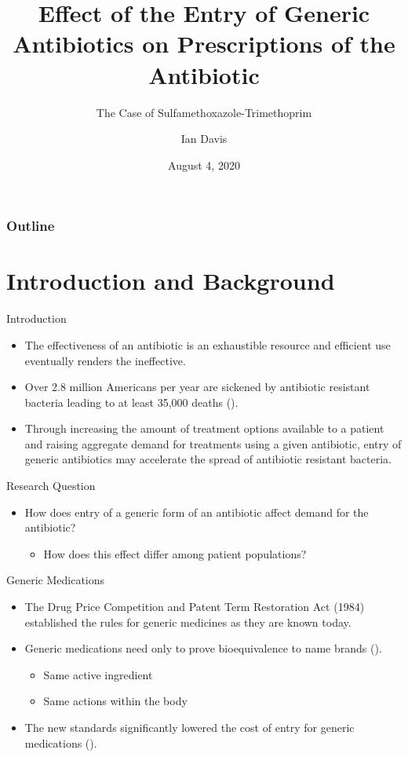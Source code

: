 \documentclass{beamer}
\title{Effect of the Entry of Generic Antibiotics on Prescriptions of the Antibiotic}
\subtitle{The Case of Sulfamethoxazole-Trimethoprim}
\author{Ian Davis}
\institute{Clemson University}
\date{August 4, 2020}
\begin{document}
\begin{frame}
\titlepage
\end{frame}

\begin{frame}
\frametitle{Outline}
\tableofcontents
\end{frame}

\section{Introduction and Background}
\begin{frame}{Introduction}
\begin{itemize}
\item The effectiveness of an antibiotic is an exhaustible resource and efficient use eventually renders the ineffective.
\item Over 2.8 million Americans per year are sickened by antibiotic resistant bacteria leading to at least 35,000 deaths (\cite{centers_for_disease_control_and_prevention_us_antibiotic_2019}).
\item Through increasing the amount of treatment options available to a patient and raising aggregate demand for treatments using a given antibiotic, entry of generic antibiotics may accelerate the spread of antibiotic resistant bacteria.
\end{itemize}
\end{frame}

\begin{frame}{Research Question}
\begin{itemize}
\item How does entry of a generic form of an antibiotic affect demand for the antibiotic? 
\begin{itemize}
\item How does this effect differ among patient populations?
\end{itemize}
\end{itemize}
\end{frame}

\begin{frame}{Generic Medications}
\begin{itemize}
\item The Drug Price Competition and Patent Term Restoration Act (1984) established the rules for generic medicines as they are known today.
\item Generic medications need only to prove bioequivalence to name brands (\cite{fda_primer}).
\begin{itemize}
  \item Same active ingredient
  \item Same actions within the body
\end{itemize}
\item The new standards significantly lowered the cost of entry for generic medications (\cite{eban_bottle_2019}).
\end{itemize}
\end{frame}
\end{document}

